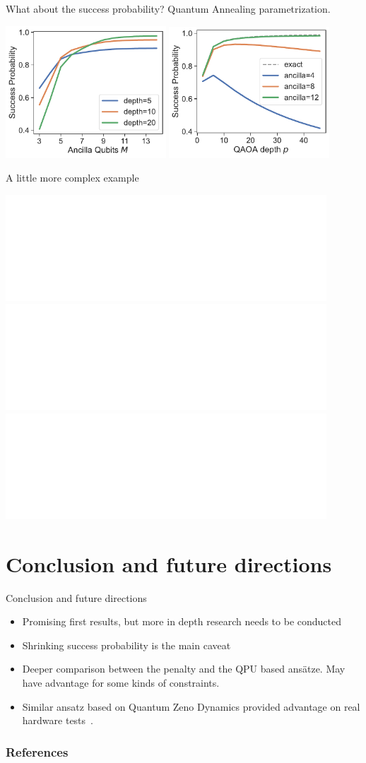 \documentclass[aspectratio=169]{beamer}
\begin{document}
\begin{frame}{What about the success probability?}
    Quantum Annealing parametrization.
    \begin{center}
        \includegraphics[width=0.45\textwidth]{../plots/prob_num_qubits.pdf}
        \includegraphics[width=0.45\textwidth]{../plots/prob_depth.pdf}
    \end{center}
\end{frame}

\begin{frame}{A little more complex example}
    \begin{center}
        \includegraphics<1>[width=0.9\textwidth]{../plots/example2.pdf}
        \includegraphics<2>[width=0.9\textwidth]{../plots/opt_example2_masked_12.pdf}
        \includegraphics<3>[width=0.9\textwidth]{../plots/opt_example2_penalty_12.pdf}
    \end{center}
\end{frame}

\section{Conclusion and future directions}

\begin{frame}{Conclusion and future directions}
    \begin{itemize}
        \item Promising first results, but more in depth research needs to be
            conducted
        \item Shrinking success probability is the main caveat
        \item Deeper comparison between the penalty and the QPU based ansätze.
            May have advantage for some kinds of constraints.
        \item Similar ansatz based on Quantum Zeno Dynamics provided advantage
            on real hardware tests~\cite{herman2023}.
    \end{itemize}
\end{frame}

\begin{frame}[allowframebreaks]
    \frametitle{References}
    \printbibliography[heading=none]
\end{frame}
\end{document}
